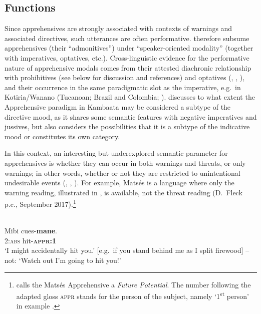\documentclass[output=paper,colorlinks,citecolor=brown
]{langscibook}
\begin{document}
\subsection{Functions}
\label{intro:functions}

Since apprehensives are strongly associated with contexts of warnings and associated directives, such utterances are often performative. \citet[179]{bybeeetal1994} therefore subsume apprehensives (their ``admonitives'') under ``speaker-oriented modality'' (together with imperatives, optatives, etc.). Cross-linguistic evidence for the performative nature of apprehensive modals comes from their attested diachronic relationship with prohibitives (see below for discussion and references) and optatives (\citealt{Dobrushina2006}, \citealt{chapters/lahaussois}, \citealt{chapters/wiemer}), and their occurrence in the same paradigmatic slot as the imperative, e.g.\ in Kotiria/Wanano (Tucanoan; Brazil and Colombia; \cite[268, 309]{stenzel2013}). \citet{chapters/treis} discusses to what extent the Apprehensive paradigm in Kambaata may be considered a subtype of the directive mood, as it shares some semantic features with negative imperatives and jussives, but also considers the possibilities that it is a subtype of the indicative mood or constitutes its own category. 

In this context, an interesting but underexplored semantic parameter for apprehensives is whether they can occur in both warnings and threats, or only warnings; in other words, whether or not they are restricted to unintentional undesirable events (\cite{vuillermet2017b}, \cite[273--274]{vuillermet2018a}, \cite{VuillermetM2018questionnaire}). For example, Matsés is a language where only the warning reading, illustrated in , is available, not the threat reading (D.\ Fleck p.c., September 2017).\footnote{\citet{fleck2003} calls the Matsés Apprehensive a \textit{Future Potential}. The number following the adapted gloss \textsc{appr} stands for the person of the subject, namely `1\textsuperscript{st} person' in example .}

\ea \label{ex:intro21} 
\\
\gll Mibi cues-\textbf{mane}. \\
2:\textsc{abs} hit-\textsc{\textbf{appr:1}} \\
\glt `I might accidentally hit you.' [e.g.\  if you stand behind me as I split firewood] -- not: `Watch out I'm going to hit you!'
\z
\end{document}
